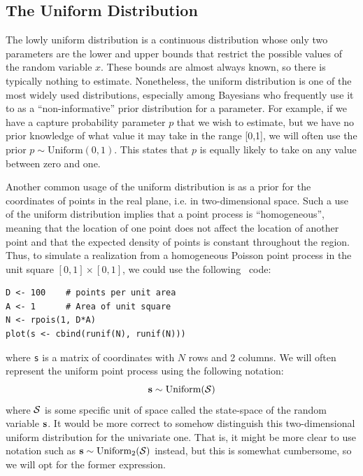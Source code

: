 \subsection{The Uniform Distribution}

The %
lowly uniform distribution is a continuous distribution whose
only two parameters are the lower and upper bounds that restrict the
possible values of the random variable $x$. These bounds
are almost always known, so there is typically nothing to
estimate. Nonetheless, the uniform
distribution is one of the most widely used distributions,
especially among Bayesians who frequently use it to as a ``non-informative''
prior distribution for a parameter. For example, if we
have a capture probability parameter $p$ that we wish to estimate, but
we have no prior knowledge of what value it may take in the range
[0,1], we will often use the prior $p \sim \text{Uniform}(0,1)$. This
states that $p$ is equally likely to take on any value between
zero and one.

Another common usage of the uniform distribution is as a prior for the
coordinates of points in the real plane, i.e. in two-dimensional
space. Such a use of the uniform distribution implies that a point process is
``homogeneous'', meaning that the location of one point does not
affect the location of another point and that the expected density of
points is constant throughout the region. Thus, to simulate a
realization from a homogeneous Poisson point process in the unit square
$[0,1] \times [0,1]$, we could use the following \R~code:
\begin{verbatim}
D <- 100    # points per unit area
A <- 1      # Area of unit square
N <- rpois(1, D*A)
plot(s <- cbind(runif(N), runif(N)))
\end{verbatim}
where \verb+s+ is a matrix of coordinates with $N$ rows and 2 columns. We
will often represent the uniform point process using the following notation:
\begin{equation}
  {\bf s} \sim \text{Uniform}(\mathcal{S})
\end{equation}
where ${\cal S}$ is some specific unit of space called the state-space
of the random variable ${\bf s}$.
It would be more correct to somehow distinguish this
two-dimensional uniform distribution for the univariate one. That is,
it might be more clear to use notation such as
${\bf s} \sim \text{Uniform}_2(\mathcal{S})$ instead, but this is somewhat
cumbersome, so we will opt for the former expression.


